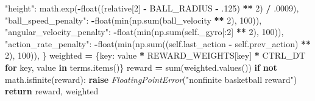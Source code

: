 \documentclass[
  american,
  11pt,
  letterpaper,
]{article}
\newenvironment{Shaded}{\begin{snugshade}}{\end{snugshade}}
\newcommand{\BuiltInTok}[1]{#1}
\newcommand{\ControlFlowTok}[1]{\textcolor[rgb]{0.13,0.29,0.53}{\textbf{#1}}}
\newcommand{\DecValTok}[1]{\textcolor[rgb]{0.00,0.00,0.81}{#1}}
\newcommand{\FloatTok}[1]{\textcolor[rgb]{0.00,0.00,0.81}{#1}}
\newcommand{\KeywordTok}[1]{\textcolor[rgb]{0.13,0.29,0.53}{\textbf{#1}}}
\newcommand{\NormalTok}[1]{#1}
\newcommand{\OperatorTok}[1]{\textcolor[rgb]{0.81,0.36,0.00}{\textbf{#1}}}
\newcommand{\PreprocessorTok}[1]{\textcolor[rgb]{0.56,0.35,0.01}{\textit{#1}}}
\newcommand{\StringTok}[1]{\textcolor[rgb]{0.31,0.60,0.02}{#1}}
\newcommand{\VariableTok}[1]{\textcolor[rgb]{0.00,0.00,0.00}{#1}}
\renewenvironment{Shaded}{\par\smallskip}{\par\smallskip}
\begin{document}
\begin{Shaded}
\begin{Highlighting}[]
            \StringTok{"height"}\NormalTok{: math.exp(}\OperatorTok{{-}}\BuiltInTok{float}\NormalTok{((relative[}\DecValTok{2}\NormalTok{] }\OperatorTok{{-}}\NormalTok{ BALL\_RADIUS }\OperatorTok{{-}} \FloatTok{.125}\NormalTok{) }\OperatorTok{**} \DecValTok{2}\NormalTok{) }\OperatorTok{/} \FloatTok{.0009}\NormalTok{),}
            \StringTok{"ball\_speed\_penalty"}\NormalTok{: }\OperatorTok{{-}}\BuiltInTok{float}\NormalTok{(}\BuiltInTok{min}\NormalTok{(np.}\BuiltInTok{sum}\NormalTok{(ball\_velocity }\OperatorTok{**} \DecValTok{2}\NormalTok{), }\DecValTok{100}\NormalTok{)),}
            \StringTok{"angular\_velocity\_penalty"}\NormalTok{: }\OperatorTok{{-}}\BuiltInTok{float}\NormalTok{(}\BuiltInTok{min}\NormalTok{(np.}\BuiltInTok{sum}\NormalTok{(}\VariableTok{self}\NormalTok{.\_gyro[:}\DecValTok{2}\NormalTok{] }\OperatorTok{**} \DecValTok{2}\NormalTok{), }\DecValTok{100}\NormalTok{)),}
            \StringTok{"action\_rate\_penalty"}\NormalTok{: }\OperatorTok{{-}}\BuiltInTok{float}\NormalTok{(}\BuiltInTok{min}\NormalTok{(np.}\BuiltInTok{sum}\NormalTok{((}\VariableTok{self}\NormalTok{.last\_action }\OperatorTok{{-}} \VariableTok{self}\NormalTok{.prev\_action) }\OperatorTok{**} \DecValTok{2}\NormalTok{), }\DecValTok{100}\NormalTok{)),}
\NormalTok{        \}}
\NormalTok{        weighted }\OperatorTok{=}\NormalTok{ \{key: value }\OperatorTok{*}\NormalTok{ REWARD\_WEIGHTS[key] }\OperatorTok{*}\NormalTok{ CTRL\_DT }\ControlFlowTok{for}\NormalTok{ key, value }\KeywordTok{in}\NormalTok{ terms.items()\}}
\NormalTok{        reward }\OperatorTok{=} \BuiltInTok{sum}\NormalTok{(weighted.values())}
        \ControlFlowTok{if} \KeywordTok{not}\NormalTok{ math.isfinite(reward):}
            \ControlFlowTok{raise} \PreprocessorTok{FloatingPointError}\NormalTok{(}\StringTok{"nonfinite basketball reward"}\NormalTok{)}
        \ControlFlowTok{return}\NormalTok{ reward, weighted}


\end{Highlighting}
\end{Shaded}
\end{document}
